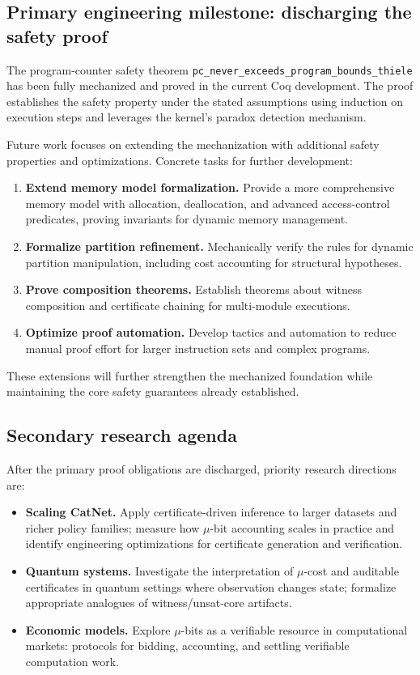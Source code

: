 \documentclass[11pt]{article}
\begin{document}
\subsection{Primary engineering milestone: discharging the safety proof}
The program-counter safety theorem \texttt{pc\_never\_exceeds\_program\_bounds\_thiele} has been fully mechanized and proved in the current Coq development. The proof establishes the safety property under the stated assumptions using induction on execution steps and leverages the kernel's paradox detection mechanism.

Future work focuses on extending the mechanization with additional safety properties and optimizations. Concrete tasks for further development:

\begin{enumerate}
  \item \textbf{Extend memory model formalization.} Provide a more comprehensive memory model with allocation, deallocation, and advanced access-control predicates, proving invariants for dynamic memory management.
  \item \textbf{Formalize partition refinement.} Mechanically verify the rules for dynamic partition manipulation, including cost accounting for structural hypotheses.
  \item \textbf{Prove composition theorems.} Establish theorems about witness composition and certificate chaining for multi-module executions.
  \item \textbf{Optimize proof automation.} Develop tactics and automation to reduce manual proof effort for larger instruction sets and complex programs.
\end{enumerate}

These extensions will further strengthen the mechanized foundation while maintaining the core safety guarantees already established.

\subsection{Secondary research agenda}
After the primary proof obligations are discharged, priority research directions are:

\begin{itemize}
  \item \textbf{Scaling CatNet.} Apply certificate-driven inference to larger datasets and richer policy families; measure how $\mu$-bit accounting scales in practice and identify engineering optimizations for certificate generation and verification.
  \item \textbf{Quantum systems.} Investigate the interpretation of $\mu$-cost and auditable certificates in quantum settings where observation changes state; formalize appropriate analogues of witness/unsat-core artifacts.
  \item \textbf{Economic models.} Explore $\mu$-bits as a verifiable resource in computational markets: protocols for bidding, accounting, and settling verifiable computation work.
\end{itemize}
\end{document}
